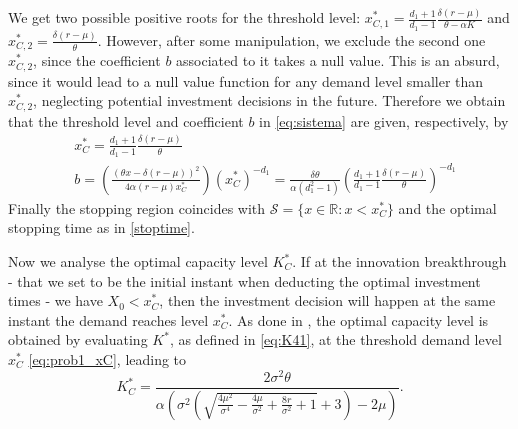 We get two possible positive roots for the threshold level: $x^*_{C,1}=\frac{d_1+1}{d_1-1} \frac{ \delta (r-\mu)}{\theta-\alpha K}$ and $x^*_{C,2}=\frac{\delta  (r-\mu )}{\theta }$. However, after some manipulation, we exclude the second one $x^*_{C,2}$, since the coefficient $b$ associated to it takes a null value. This is an absurd, since it would lead to a null value function for any demand level smaller than $x^*_{C,2}$, neglecting potential investment decisions in the future.
Therefore we obtain that the threshold level and coefficient $b$ in \eqref{eq:sistema} are given, respectively, by
\begin{align}
 &x_C^*=\frac{d_1+1}{d_1-1} \frac{ \delta (r-\mu)}{\theta} \label{eq:prob1_xC}\\
 &b=\left( \frac{(\theta x -\delta (r-\mu))^2}{4 \alpha (r-\mu) x_C^*} \right)(x_C^*)^{-d_1} = \frac{\delta \theta}{\alpha (d_1^2-1)} \left( \frac{d_1+1}{d_1-1} \frac{ \delta (r-\mu)}{\theta} \right)^{-d_1} \nonumber
\end{align}
Finally the stopping region coincides with $\mathcal{S}=\{x\in \mathds{R}:x< x_C^* \}$ and the optimal stopping time as in \eqref{stoptime}.

Now we analyse the optimal capacity level $K^*_C$. If at the innovation breakthrough - that we set to be the initial instant when deducting the optimal investment times - we have $X_0<x^*_C$, then the investment decision will happen at the same instant the demand reaches level $x^*_C$. 
As done in \cite{huis:cap}, the optimal capacity level is obtained by evaluating $K^*$, as defined in \eqref{eq:K41}, at the threshold demand level $x^*_C$ \eqref{eq:prob1_xC}, leading to
\begin{equation}
K^*_C=\frac{2 \sigma ^2 \theta}{\alpha \left(\sigma ^2 \left(\sqrt{\frac{4 \mu ^2}{\sigma ^4}-\frac{4 \mu }{\sigma ^2}+\frac{8 r}{\sigma ^2}+1}+3\right)-2 \mu \right)}.
\label{prob1:K*}
\end{equation}


